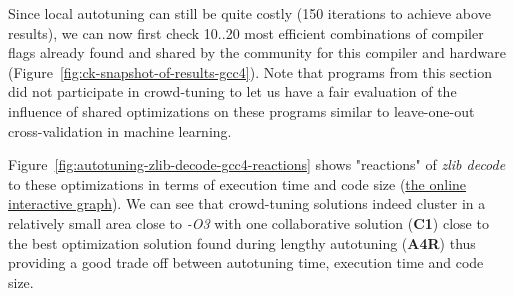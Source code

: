 Since local autotuning can still be quite costly (150 iterations to achieve above results),
we can now first check 10..20 most efficient combinations of compiler flags 
already found and shared by the community for this compiler and hardware
(Figure~\ref{fig:ck-snapshot-of-results-gcc4}).
%
Note that programs from this section did not participate in crowd-tuning
to let us have a fair evaluation of the influence of shared optimizations 
on these programs similar to leave-one-out cross-validation in machine learning.

Figure~\ref{fig:autotuning-zlib-decode-gcc4-reactions} shows "reactions" 
of \textit{zlib decode} to these optimizations in terms of execution time and code size 
(\href{http://cknowledge.org/repo/web.php?wcid=graph:47f0b282396776c4&subgraph=rpi3-autotuning-zlib-decode-gcc4-reactions-interactive}{the online interactive graph}).
%
We can see that crowd-tuning solutions indeed cluster in a relatively small area 
close to \textit{-O3} with one collaborative solution (\textbf{C1}) close to the 
best optimization solution found during lengthy autotuning (\textbf{A4R}) 
thus providing a good trade off between autotuning time, execution time and code size.

